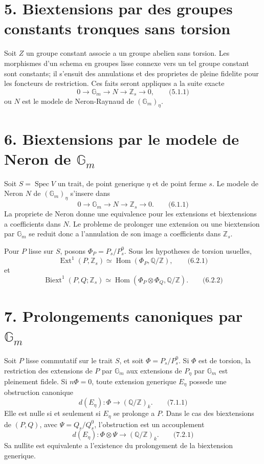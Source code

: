 \documentclass[11pt]{article}
\providecommand{\Spec}{\operatorname{Spec}}
\providecommand{\Z}{\mathbb Z}
\providecommand{\Q}{\mathbb Q}
\providecommand{\Gm}{\mathbb G_m}
\providecommand{\Hom}{\operatorname{Hom}}
\providecommand{\Ext}{\operatorname{Ext}}
\providecommand{\Biext}{\operatorname{Biext}}
\providecommand{\Ext}{\operatorname{Ext}}
\providecommand{\Hom}{\operatorname{Hom}}
\providecommand{\Spec}{\operatorname{Spec}}
\providecommand{\Gm}{\mathbb G_m}
\providecommand{\Z}{\mathbb Z}
\providecommand{\Q}{\mathbb Q}
\begin{document}
\section*{5. Biextensions par des groupes constants tronques sans torsion}

Soit \(Z\) un groupe constant associe a un groupe abelien sans torsion.  Les morphismes d'un schema en groupes lisse connexe vers un tel groupe constant sont constants; il s'ensuit des annulations et des proprietes de pleine fidelite pour les foncteurs de restriction.  Ces faits seront appliques a la suite exacte
\[
        0\longrightarrow \Gm\longrightarrow N\longrightarrow \Z_s\longrightarrow 0,
\qquad\text{(5.1.1)}
\]
ou \(N\) est le modele de Neron-Raynaud de \((\Gm)_\eta\).

\section*{6. Biextensions par le modele de Neron de \(\Gm\)}

Soit \(S=\Spec V\) un trait, de point generique \(\eta\) et de point ferme \(s\).  Le modele de Neron \(N\) de \((\Gm)_\eta\) s'insere dans
\[
        0\longrightarrow \Gm\longrightarrow N\longrightarrow \Z_s\longrightarrow 0.
\qquad\text{(6.1.1)}
\]
La propriete de Neron donne une equivalence pour les extensions et biextensions a coefficients dans \(N\).  Le probleme de prolonger une extension ou une biextension par \(\Gm\) se reduit donc a l'annulation de son image a coefficients dans \(\Z_s\).

Pour \(P\) lisse sur \(S\), posons \(\Phi_P=P_s/P_s^0\).  Sous les hypotheses de torsion usuelles,
\[
        \Ext^1(P,\Z_s)\simeq \Hom(\Phi_P,\Q/\Z),
\qquad\text{(6.2.1)}
\]
et
\[
        \Biext^1(P,Q;\Z_s)\simeq \Hom(\Phi_P\otimes\Phi_Q,\Q/\Z).
\qquad\text{(6.2.2)}
\]

\section*{7. Prolongements canoniques par \(\Gm\)}

Soit \(P\) lisse commutatif sur le trait \(S\), et soit \(\Phi=P_s/P_s^0\).  Si \(\Phi\) est de torsion, la restriction des extensions de \(P\) par \(\Gm\) aux extensions de \(P_\eta\) par \(\Gm\) est pleinement fidele.  Si \(n\Phi=0\), toute extension generique \(E_\eta\) possede une obstruction canonique
\[
        d(E_\eta):\Phi\longrightarrow (\Q/\Z)_k.
\qquad\text{(7.1.1)}
\]
Elle est nulle si et seulement si \(E_\eta\) se prolonge a \(P\).  Dans le cas des biextensions de \((P,Q)\), avec \(\Psi=Q_s/Q_s^0\), l'obstruction est un accouplement
\[
        d(E_\eta):\Phi\otimes\Psi\longrightarrow (\Q/\Z)_k.
\qquad\text{(7.2.1)}
\]
Sa nullite est equivalente a l'existence du prolongement de la biextension generique.
\end{document}
